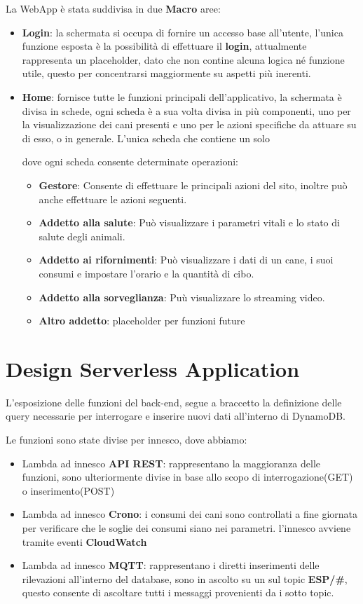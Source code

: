 La WebApp è stata suddivisa in due \textbf{Macro} aree:
\begin{itemize}
    \item \textbf{Login}: la schermata si occupa di fornire un accesso base all'utente, l'unica funzione esposta è la possibilità di effettuare il \textbf{login}, attualmente rappresenta un placeholder, dato che non contine alcuna logica né funzione utile, questo per concentrarsi maggiormente su aspetti più inerenti. 
    \item \textbf{Home}: fornisce tutte le funzioni principali dell'applicativo,
    la schermata è divisa in schede, ogni scheda è a sua volta divisa in più componenti, uno per la visualizzazione dei cani presenti e uno per le azioni specifiche da attuare su di esso, o in generale.
    L'unica scheda che contiene un solo
    
    dove ogni scheda consente determinate operazioni:
    \begin{itemize}
        \item \textbf{Gestore}: Consente di effettuare le principali azioni del sito, inoltre può anche effettuare le azioni seguenti.
        \item \textbf{Addetto alla salute}: Può visualizzare i parametri vitali e lo stato di salute degli animali.
        \item \textbf{Addetto ai rifornimenti}: Può visualizzare i dati di un cane, i suoi consumi e impostare l'orario e la quantità di cibo.
        \item \textbf{Addetto alla sorveglianza}: Puù visualizzare lo streaming video.
        \item \textbf{Altro addetto}: placeholder per funzioni future
    \end{itemize}    
    
\end{itemize}


\section{Design Serverless Application}

L'esposizione delle funzioni del back-end, segue a braccetto la definizione delle query necessarie per interrogare e inserire nuovi dati all'interno di DynamoDB.

Le funzioni sono state divise per innesco, dove abbiamo: 
\begin{itemize}
    \item Lambda ad innesco \textbf{API REST}: rappresentano la maggioranza delle funzioni, sono ulteriormente divise in base allo scopo di interrogazione(GET) o inserimento(POST)
    \item Lambda ad innesco \textbf{Crono}: i consumi dei cani sono controllati a fine giornata per verificare che le soglie dei consumi siano nei parametri. 
    l'innesco avviene tramite eventi \textbf{CloudWatch}
    \item Lambda ad innesco \textbf{MQTT}: rappresentano i diretti inserimenti delle rilevazioni all'interno del database, sono in ascolto su un sul topic \textbf{ESP/\#}, questo consente di ascoltare tutti i messaggi provenienti da i sotto topic.
\end{itemize}


